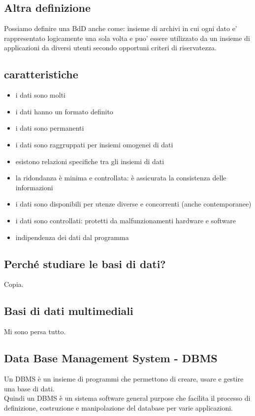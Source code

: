 \subsection{Altra definizione}
    Possiamo definire una BdD anche come: insieme di archivi in cui ogni dato e' rappresentato logicamente una sola volta e puo' essere utilizzato da un insieme di applicazioni da diversi utenti secondo opportuni criteri di riservatezza.

\subsection{caratteristiche}
\begin{itemize}
    \item i dati sono molti
    \item i dati hanno un formato definito
    \item i dati sono permanenti
    \item i dati sono raggruppati per insiemi omogenei di dati
    \item esistono relazioni specifiche tra gli insiemi di dati
    \item la ridondanza è minima e controllata: è assicurata la consistenza delle informazioni
    \item i dati sono disponibili per utenze diverse e concorrenti (anche contemporanee)
    \item i dati sono controllati: protetti da malfunzionamenti hardware e software 
    \item indipendenza dei dati dal programma    
\end{itemize}

\subsection{Perché studiare le basi di dati?}
Copia.

\subsection{Basi di dati multimediali}
Mi sono persa tutto.

\subsection{Data Base Management System - DBMS}
Un DBMS è un insieme di programmi che permettono di creare, usare e gestire una base di dati.
\\Quindi un DBMS è un sistema software general purpose che facilita il processo di definizione, costruzione e manipolazione del database per varie applicazioni.

